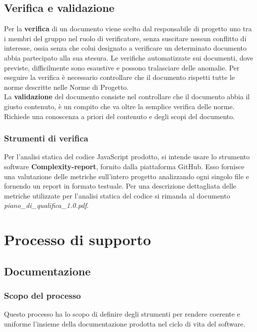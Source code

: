 \documentclass[a4paper,11pt]{article}
\begin{document}
	\subsection{Verifica e validazione}
	Per la \textbf{verifica} di un documento viene scelto dal responsabile di progetto uno tra i membri del gruppo nel ruolo di verificatore, senza suscitare nessun conflitto di interesse, ossia senza che colui designato a verificare un determinato documento abbia partecipato alla sua stesura.
	 Le verifiche automatizzate sui documenti, dove previste, difficilmente sono esaustive e possono tralasciare delle anomalie. Per eseguire la verifica è necessario controllare che il documento rispetti tutte le norme descritte nelle Norme di Progetto. \\
	La \textbf{validazione} del documento consiste nel controllare che il documento abbia il giusto contenuto, è un compito che va oltre la semplice verifica delle norme. Richiede una conoscenza a priori del contenuto e degli scopi del documento.
\subsubsection{Strumenti di verifica}

Per l'analisi statica del codice JavaScript prodotto, si intende usare lo strumento software \textbf{Complexity-report\addglos}, fornito dalla piattaforma GitHub.
Esso fornisce una valutazione delle metriche sull'intero progetto analizzando ogni singolo file e fornendo un report in formato testuale.
Per una descrizione dettagliata delle metriche utilizzate per l'analisi statica del codice si rimanda al documento \textit{piano\_di\_qualifica\_1.0.pdf}.
		
	\section{Processo di supporto}
		\subsection{Documentazione}
		
			\subsubsection{Scopo del processo}
			Questo processo ha lo scopo di definire degli strumenti per rendere coerente e uniforme l'insieme della documentazione prodotta nel ciclo di vita del software.
			
\end{document}
